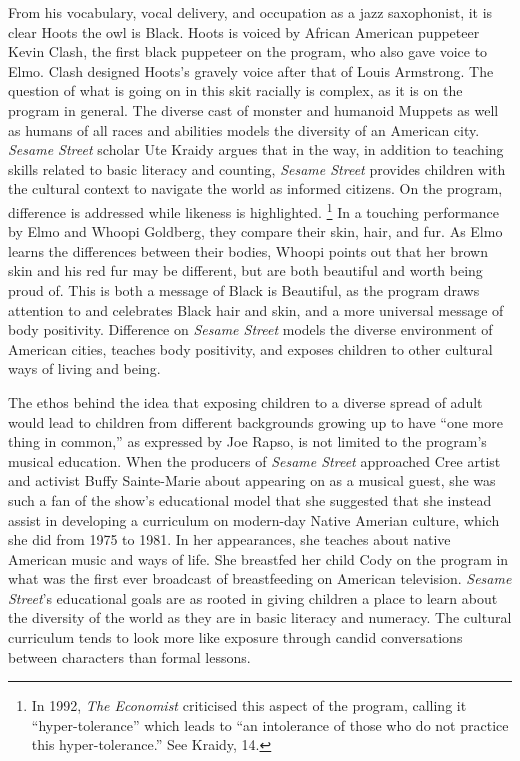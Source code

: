 \documentclass[12pt,letterpaper]{article}
\newcommand{\ses}{\textit{Sesame Street }}
\begin{document}
	From his vocabulary, vocal delivery, and occupation as a jazz 
	saxophonist, it is clear Hoots the owl is Black. Hoots is voiced by 
	African American puppeteer Kevin Clash, the first black puppeteer on the
	program, who also gave voice to Elmo. 
	Clash designed Hoots's gravely voice after that of Louis 
	Armstrong.\autocites()(Also see the biographical documentary of the same
	name.)[41]{Clash} The question of what is going on in this skit racially
	is complex, as it is on the program in general. The diverse cast of 
	monster and humanoid Muppets as well as humans of all races and 
	abilities models the diversity of an American city. \ses scholar Ute 
	Kraidy argues that in the way, in addition to teaching skills related
	to basic literacy and counting, \textit{Sesame Street} provides children
	with the cultural context to navigate the world as informed citizens.
	\autocite[13]{Kraidy} On the program, difference is addressed while
	likeness is highlighted\autocite[18]{Kraidy}. \footnote{In 
	1992, \textit{The Economist} criticised this aspect of the program, 
	calling it ``hyper-tolerance'' which leads to ``an intolerance of those
	who do not practice this hyper-tolerance.'' See Kraidy, 14.} In a
	touching performance by Elmo and Whoopi Goldberg, they
	compare their skin, hair, and fur. As Elmo learns the differences 
	between their bodies, Whoopi points out that her brown skin and his 
	red fur may be different, but are both beautiful and worth being proud 
	of.\autocite{2746} This is both a message of Black is Beautiful, as
	the program draws attention to and celebrates Black hair and skin, and 
	a more universal message of body positivity. Difference on \ses models
	the diverse environment of American cities, teaches body positivity, 
	and exposes children to other cultural ways of living and being.

	The ethos behind the idea that exposing children to a diverse spread 
	of adult would lead to children from different backgrounds growing up
	to have ``one more thing in common,'' as expressed by Joe Rapso, is not
	limited to the program's musical education. When the producers of 
	\ses approached Cree artist and activist Buffy Sainte-Marie about
	appearing on as a musical guest, she was such a fan of the show's 
	educational 
	model that she suggested that she instead assist in developing a 
	curriculum on modern-day Native Amerian culture, which she did from 
	1975 to 1981.\autocite[235]{Davis} In her appearances, she teaches 
	about native American music and ways of life. She breastfed her 
	child Cody on the program in what was the first ever broadcast of 
	breastfeeding on American television. \textit{Sesame Street}'s 
	educational goals are as rooted in giving children a place to learn
	about the diversity of the world as they are in basic literacy
	and numeracy. The cultural curriculum tends to look more like exposure
	through candid conversations between characters than formal
	lessons.  
\end{document}
